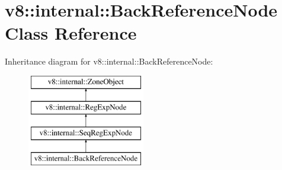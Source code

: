 \hypertarget{classv8_1_1internal_1_1BackReferenceNode}{}\section{v8\+:\+:internal\+:\+:Back\+Reference\+Node Class Reference}
\label{classv8_1_1internal_1_1BackReferenceNode}
Inheritance diagram for v8\+:\+:internal\+:\+:Back\+Reference\+Node\+:\begin{figure}[H]
\begin{center}
\leavevmode
\includegraphics[height=4.000000cm]{classv8_1_1internal_1_1BackReferenceNode}
\end{center}
\end{figure}
